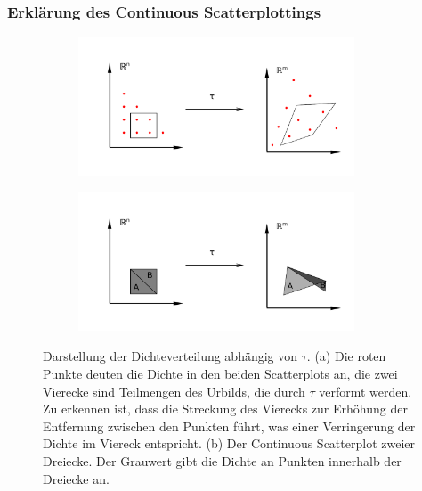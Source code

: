 \documentclass[a4paper,fontsize=12pt,toc=bib,halfparskip,ngerman]{scrartcl}
\begin{document}
\subsubsection{Erkl\"arung des Continuous Scatterplottings}
\begin{figure}
	\centering
	\begin{subfigure}{0.45\textwidth}
		\includegraphics[width=0.9\textwidth]{pictures/ContinuousScatterplot}
		\subcaption{}
	\end{subfigure}
	\begin{subfigure}{0.45\textwidth}
		\includegraphics[width=0.9\textwidth]{pictures/Case2}
		\subcaption{}
		\label{Case2}
	\end{subfigure}
	\caption{Darstellung der Dichteverteilung abh\"angig von $\tau$. (a) Die roten Punkte deuten die Dichte in den beiden Scatterplots an, die zwei Vierecke sind Teilmengen des Urbilds, die durch $\tau$ verformt werden. Zu erkennen ist, dass die Streckung des Vierecks zur Erh\"ohung der Entfernung zwischen den Punkten f\"uhrt, was einer Verringerung der Dichte im Viereck entspricht. (b) Der Continuous Scatterplot zweier Dreiecke. Der Grauwert gibt die Dichte an Punkten innerhalb der Dreiecke an.}
	\label{ContinuousScatterplot}
\end{figure}
\end{document}

